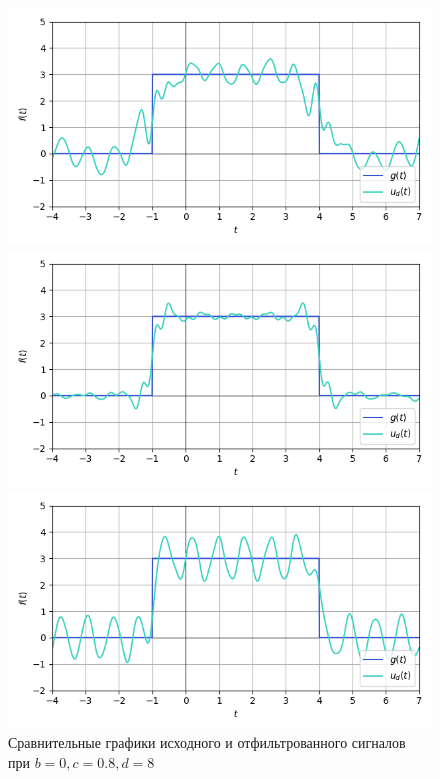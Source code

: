 \documentclass[a4paper]{article}
\begin{document}
\begin{figure}[H]
    \begin{minipage}{0.33\textwidth}
        \centering \includegraphics[width=\textwidth]{sources/band-stop filter/denoised (b=0, c=0.8, d=8, v=5).png}
        \caption{$v = 5$}
    \end{minipage}\hfill
    \begin{minipage}{0.33\textwidth}
        \centering \includegraphics[width=\textwidth]{sources/band-stop filter/denoised (b=0, c=0.8, d=8, v=9).png}
        \caption{$v = 9$}
    \end{minipage}\hfill
    \begin{minipage}{0.33\textwidth}
        \centering \includegraphics[width=\textwidth]{sources/band-stop filter/denoised (b=0, c=0.8, d=8, v=16).png}
        \caption{$v = 16$}
    \end{minipage}
    \caption*{Сравнительные графики исходного и отфильтрованного сигналов при $b=0, c=0.8, d=8$}
\end{figure}
\end{document}
